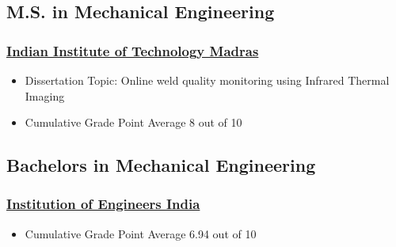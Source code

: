 \documentclass{my_cv}%
\begin{document}
\subsection{M.S. in Mechanical Engineering}
\subsubsection{\faInstitution \hspace{0.2em} \href{https://www.iitm.ac.in/}{Indian Institute of Technology Madras}}
\begin{itemize}[leftmargin=0.15in]
\setlength\itemsep{-0.1em}
\color{mygray}
\item Dissertation Topic: Online weld quality monitoring using Infrared Thermal Imaging
\item Cumulative Grade Point Average 8 out of 10
\end{itemize}
{\color{mygray1} \hdashrule[0.1ex]{18.8cm}{0.2mm}{1mm}}
\subsection{Bachelors in Mechanical Engineering}
\subsubsection{\faInstitution \hspace{0.2em} \href{https://www.ieindia.org/webui/iei-home.aspx}{Institution of Engineers India}}
\begin{itemize}[leftmargin=0.15in]
\setlength\itemsep{-0.1em}
\color{mygray}
\item Cumulative Grade Point Average 6.94 out of 10
\end{itemize}
\end{document}
